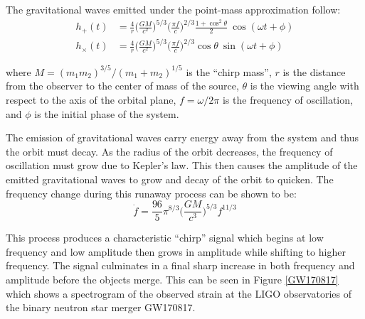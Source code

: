 \documentclass [12pt, proquest]{uwthesis}[2019]
\begin{document}
The gravitational waves emitted under the point-mass approximation follow:
\begin{align}
h_+(t)&=\frac{4}{r}\bigg(\frac{GM}{c^2}\bigg)^{5/3} \bigg( \frac{\pi f}{c} \bigg)^{2/3} \frac{1+\cos^2\theta}{2} \ \cos(\omega t + \phi)\\
h_\times(t)&=\frac{4}{r}\bigg(\frac{GM}{c^2}\bigg)^{5/3} \bigg( \frac{\pi f}{c} \bigg)^{2/3} \cos\theta\ \sin(\omega t + \phi)
\end{align}

where $M=(m_1 m_2)^{3/5}/(m_1+m_2)^{1/5}$ is the ``chirp mass'', $r$ is the distance from the observer to the center of mass of the source, $\theta$ is the viewing angle with respect to the axis of the orbital plane, $f=\omega/2\pi$ is the frequency of oscillation, and $\phi$ is the initial phase of the system.

The emission of gravitational waves carry energy away from the system and thus the orbit must decay. As the radius of the orbit decreases, the frequency of oscillation must grow due to Kepler's law. This then causes the amplitude of the emitted gravitational waves to grow and decay of the orbit to quicken. The frequency change during this runaway process can be shown to be:
\begin{equation}
\dot{f}=\frac{96}{5}\pi^{8/3}\bigg(\frac{G M}{c^3}\bigg)^{5/3} f^{11/3}
\end{equation}

This process produces a characteristic ``chirp'' signal which begins at low frequency and low amplitude then grows in amplitude while shifting to higher frequency. The signal culminates in a final sharp increase in both frequency and amplitude before the objects merge. This can be seen in Figure \ref{GW170817} which shows a spectrogram of the observed strain at the LIGO observatories of the binary neutron star merger GW170817.
 
\end{document}
